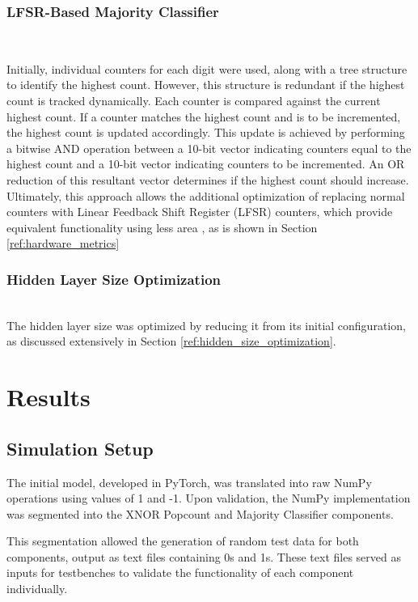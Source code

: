 \documentclass[conference]{IEEEtran}
\begin{document}
\subsubsection{LFSR-Based Majority Classifier}
\hfill\\
\label{ref:lfsr_opt}

Initially, individual counters for each digit were used, along with a tree structure to identify the highest count. However, this structure is redundant if the highest count is tracked dynamically. Each counter is compared against the current highest count. If a counter matches the highest count and is to be incremented, the highest count is updated accordingly. This update is achieved by performing a bitwise AND operation between a 10-bit vector indicating counters equal to the highest count and a 10-bit vector indicating counters to be incremented. An OR reduction of this resultant vector determines if the highest count should increase. 
Ultimately, this approach allows the additional optimization of replacing normal counters with Linear Feedback Shift Register (LFSR) counters, which provide equivalent functionality using less area \cite{xilinx_lfsr}, as is shown in Section \ref{ref:hardware_metrics}

\subsubsection{Hidden Layer Size Optimization}
\hfill\\

The hidden layer size was optimized by reducing it from its initial configuration, as discussed extensively in Section \ref{ref:hidden_size_optimization}.


\section{Results}
\label{sec:results}
\subsection{Simulation Setup}

The initial model, developed in PyTorch, was translated into raw NumPy operations using values of 1 and -1. Upon validation, the NumPy implementation was segmented into the XNOR Popcount and Majority Classifier components.

This segmentation allowed the generation of random test data for both components, output as text files containing 0s and 1s. These text files served as inputs for testbenches to validate the functionality of each component individually.
\end{document}
